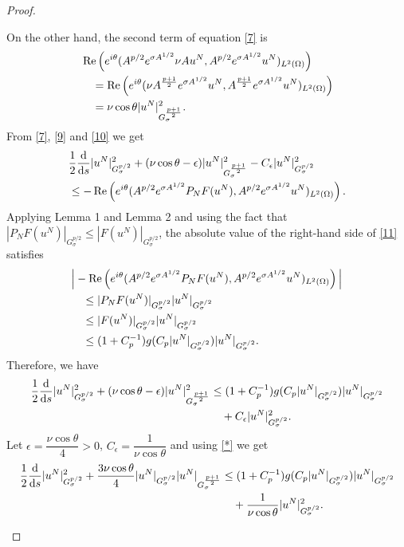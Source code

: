 \documentclass[12pt]{article}
\theoremstyle{plain}
\theoremstyle{remark}
\newcommand{\dd}{\mathrm{d}}
\begin{document}
\begin{proof}
\begin{enumerate}
On the other hand, the second term of equation \eqref{7} is
\begin{align}
&\operatorname{Re}\left(e^{i\theta}( A^{p/2} e^{\sigma A^{1/2}} \nu Au^N, A^{p/2} e^{\sigma A^{1/2}} u^N )_ {L^2(\Omega)}\right) \notag \\
&\quad = \operatorname{Re}\left( e^{i\theta}(\nu  A^{\frac{p+1}{2}} e^{\sigma A^{1/2}} u^N, A^{\frac{p+1}{2}} e^{\sigma A^{1/2}} u^N )_ {L^2(\Omega)}\right) \notag \\
&\quad = \nu \cos\theta|u^N|_{G_\sigma^{\frac{p+1}{2}}}^2.\label{10}
\end{align}
 From \eqref{7}, \eqref{9} and \eqref{10} we get 
\begin{align}
& \frac{1}{2} \frac{\dd}{\dd s} |u^N|_{G_\sigma^{p/2}}^2 + (\nu \cos\theta -\epsilon)|u^N|_{G_\sigma^{\frac{p+1}{2}}}^2 -C_{\epsilon}|u^N|_{
G_\sigma^{p/2}
}^2 \notag \\
&\leq -\operatorname{Re}\left( e^{i\theta}( A^{p/2} e^{\sigma A^{1/2}} P_N F(u^N), A^{p/2} e^{\sigma A^{1/2}} u^N)_ {L^2(\Omega)}\right).\label{11}
\end{align}
 Applying Lemma 1 and Lemma 2 and using the fact that  $|P_N F(u^N)|_{G_\sigma^{p/2}}\leq|F(u^N)|_{G_\sigma^{p/2}} $, the absolute value of the right-hand side of \eqref{11} satisfies
\begin{align*}
& \Big|-\operatorname{Re}\left( e^{i\theta}( A^{p/2} e^{\sigma A^{1/2} } P_N F(u^N), A^{p/2} e^{\sigma A^{1/2}} u^N)_{L^2(\Omega)}\right)\Big| \notag \\
&\quad \leq |P_N F(u^N)|_{G_\sigma^{p/2}}|u^N|_{G_\sigma^{p/2}} \notag \\
&\quad \leq |F(u^N)|_{G_\sigma^{p/2}}|u^N|_{G_\sigma^{p/2}} \notag \\
&\quad \leq  (1+C_p^{-1})g(C_p |u^N|_{G_\sigma^{p/2}})|u^N|_{G_\sigma^{p/2}}.
\end{align*}
Therefore, we have 
\begin{align*}
\frac{1}{2} \frac{\dd}{\dd s} |u^N|_{G_\sigma^{p/2}}^2 + (\nu \cos\theta-\epsilon) |u^N|_{G_\sigma^{\frac{p+1}{2}}}^2 & \leq (1+C_p^{-1})g(C_p |u^N|_{G_\sigma^{p/2}})|u^N|_{G_\sigma^{p/2}}\notag \\&\quad+C_{\epsilon}|u^N|_{G_\sigma^{p/2}}^2. 
\end{align*}
Let $\epsilon = \dfrac{\nu \cos\theta}{4} > 0$, $C_\epsilon = \dfrac{1}{\nu \cos\theta}$  and using \eqref{*} we get
\begin{align*}
  \frac{1}{2} \frac{\dd}{\dd s} |u^N|_{G_\sigma^{p/2}}^2+ \frac{3\nu \cos\theta}{4} |u^N|_{G_\sigma^{p/2}}|u^N|_{G_\sigma^{\frac{p+1}{2}}} & \leq (1+C_p^{-1})g(C_p |u^N|_{G_\sigma^{p/2}})|u^N|_{G_\sigma^{p/2}}\notag \\&\quad+\frac{1}{\nu \cos\theta}|u^N|_{G_\sigma^{p/2}}^2. 

\end{align*}
\end{enumerate}
\end{proof}
\end{document}
